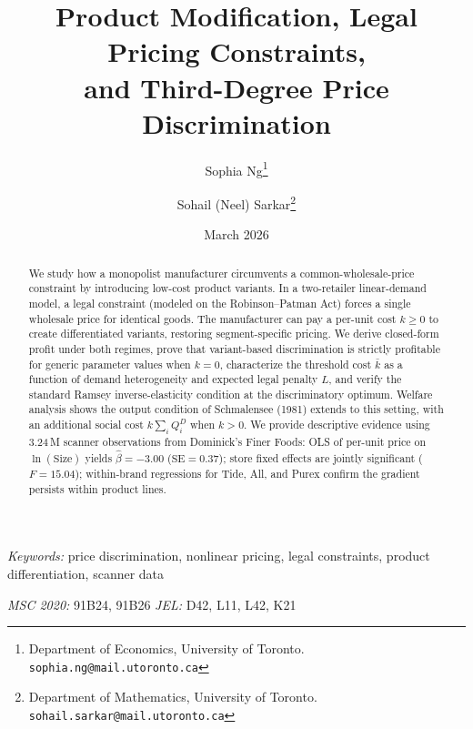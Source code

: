 \documentclass[11pt,a4paper]{article}
\theoremstyle{plain}
\theoremstyle{definition}
\theoremstyle{remark}
\begin{document}
\title{Product Modification, Legal Pricing Constraints,\\ and Third-Degree Price Discrimination}

\author{%
  Sophia Ng\thanks{Department of Economics, University of Toronto. \texttt{sophia.ng@mail.utoronto.ca}}
  \and
  Sohail (Neel) Sarkar\thanks{Department of Mathematics, University of Toronto. \texttt{sohail.sarkar@mail.utoronto.ca}}
}

\date{March 2026}

\maketitle

\begin{abstract}
We study how a monopolist manufacturer circumvents a common-wholesale-price constraint by introducing low-cost product variants.
In a two-retailer linear-demand model, a legal constraint (modeled on the Robinson--Patman Act) forces a single wholesale price for identical goods.
The manufacturer can pay a per-unit cost $k\ge 0$ to create differentiated variants, restoring segment-specific pricing.
We derive closed-form profit under both regimes, prove that variant-based discrimination is strictly profitable for generic parameter values when $k=0$, characterize the threshold cost $\bar{k}$ as a function of demand heterogeneity and expected legal penalty $L$, and verify the standard Ramsey inverse-elasticity condition at the discriminatory optimum.
Welfare analysis shows the output condition of Schmalensee (1981) extends to this setting, with an additional social cost $k\sum_i Q_i^D$ when $k>0$.
We provide descriptive evidence using 3.24\,M scanner observations from Dominick's Finer Foods: OLS of per-unit price on $\ln(\text{Size})$ yields $\hat\beta = -3.00$ ($\text{SE}=0.37$); store fixed effects are jointly significant ($F=15.04$); within-brand regressions for Tide, All, and Purex confirm the gradient persists within product lines.
\end{abstract}

\smallskip
\noindent\textit{Keywords:} price discrimination, nonlinear pricing, legal constraints, product differentiation, scanner data

\smallskip
\noindent\textit{MSC 2020:} 91B24, 91B26 \quad\textit{JEL:} D42, L11, L42, K21

\bigskip


\end{document}
